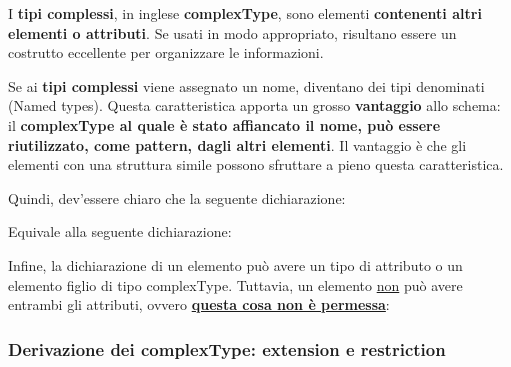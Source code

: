 \documentclass[a4paper]{article}
\begin{document}
	I \textcolor{Red3}{\textbf{tipi complessi}}, in inglese \textbf{\textsf{complexType}}, sono elementi \textbf{contenenti altri elementi o attributi}. Se usati in modo appropriato, risultano essere un costrutto eccellente per organizzare le informazioni.\newline
	
	\noindent
	Se ai \textbf{tipi complessi} viene assegnato un nome, diventano dei tipi denominati (Named types). Questa caratteristica apporta un grosso \textcolor{Green4}{\textbf{vantaggio}} allo schema: il \textbf{\textsf{complexType} al quale è stato affiancato il nome, può essere riutilizzato, come pattern, dagli altri elementi}. Il vantaggio è che gli elementi con una struttura simile possono sfruttare a pieno questa caratteristica.
	
	Quindi, dev'essere chiaro che la seguente dichiarazione:
	
	Equivale alla seguente dichiarazione:
	\newpage
	
	\noindent
	Infine, la dichiarazione di un elemento può avere un tipo di attributo o un elemento figlio di tipo \textsf{complexType}. Tuttavia, un elemento \underline{non} può avere entrambi gli attributi, ovvero \textbf{\underline{questa cosa non è permessa}}:
	\newpage
	
	\subsubsection{Derivazione dei \textsf{complexType}: \textsf{extension} e \textsf{restriction}}\label{par: derivazione dei complexType: extension e restriction}
	
\end{document}

